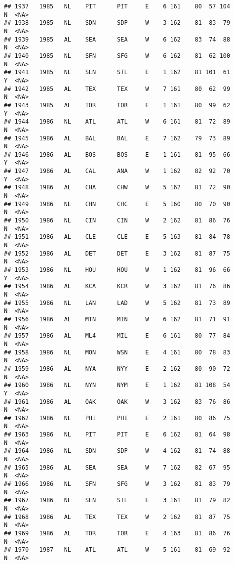 \documentclass[]{article}
\begin{document}
\begin{verbatim}
## 1937   1985   NL    PIT      PIT     E    6 161    80  57 104      N  <NA>
## 1938   1985   NL    SDN      SDP     W    3 162    81  83  79      N  <NA>
## 1939   1985   AL    SEA      SEA     W    6 162    83  74  88      N  <NA>
## 1940   1985   NL    SFN      SFG     W    6 162    81  62 100      N  <NA>
## 1941   1985   NL    SLN      STL     E    1 162    81 101  61      Y  <NA>
## 1942   1985   AL    TEX      TEX     W    7 161    80  62  99      N  <NA>
## 1943   1985   AL    TOR      TOR     E    1 161    80  99  62      Y  <NA>
## 1944   1986   NL    ATL      ATL     W    6 161    81  72  89      N  <NA>
## 1945   1986   AL    BAL      BAL     E    7 162    79  73  89      N  <NA>
## 1946   1986   AL    BOS      BOS     E    1 161    81  95  66      Y  <NA>
## 1947   1986   AL    CAL      ANA     W    1 162    82  92  70      Y  <NA>
## 1948   1986   AL    CHA      CHW     W    5 162    81  72  90      N  <NA>
## 1949   1986   NL    CHN      CHC     E    5 160    80  70  90      N  <NA>
## 1950   1986   NL    CIN      CIN     W    2 162    81  86  76      N  <NA>
## 1951   1986   AL    CLE      CLE     E    5 163    81  84  78      N  <NA>
## 1952   1986   AL    DET      DET     E    3 162    81  87  75      N  <NA>
## 1953   1986   NL    HOU      HOU     W    1 162    81  96  66      Y  <NA>
## 1954   1986   AL    KCA      KCR     W    3 162    81  76  86      N  <NA>
## 1955   1986   NL    LAN      LAD     W    5 162    81  73  89      N  <NA>
## 1956   1986   AL    MIN      MIN     W    6 162    81  71  91      N  <NA>
## 1957   1986   AL    ML4      MIL     E    6 161    80  77  84      N  <NA>
## 1958   1986   NL    MON      WSN     E    4 161    80  78  83      N  <NA>
## 1959   1986   AL    NYA      NYY     E    2 162    80  90  72      N  <NA>
## 1960   1986   NL    NYN      NYM     E    1 162    81 108  54      Y  <NA>
## 1961   1986   AL    OAK      OAK     W    3 162    83  76  86      N  <NA>
## 1962   1986   NL    PHI      PHI     E    2 161    80  86  75      N  <NA>
## 1963   1986   NL    PIT      PIT     E    6 162    81  64  98      N  <NA>
## 1964   1986   NL    SDN      SDP     W    4 162    81  74  88      N  <NA>
## 1965   1986   AL    SEA      SEA     W    7 162    82  67  95      N  <NA>
## 1966   1986   NL    SFN      SFG     W    3 162    81  83  79      N  <NA>
## 1967   1986   NL    SLN      STL     E    3 161    81  79  82      N  <NA>
## 1968   1986   AL    TEX      TEX     W    2 162    81  87  75      N  <NA>
## 1969   1986   AL    TOR      TOR     E    4 163    81  86  76      N  <NA>
## 1970   1987   NL    ATL      ATL     W    5 161    81  69  92      N  <NA>

\end{verbatim}
\end{document}
